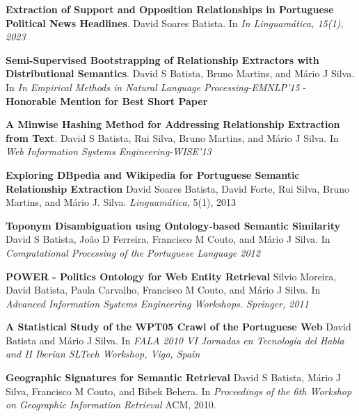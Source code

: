 
\vspace{-5.5mm}

\begin{cventries}

  \cventry
    {} %
    {} %
    {} %
    {} %
    {
      \begin{cvitems} %
        \item {{\bf Extraction of Support and Opposition Relationships in Portuguese Political News Headlines}. David Soares Batista. In {\it In Linguamática, 15(1), 2023}}
  		\vspace{1.0mm}
        \item {{\bf Semi-Supervised Bootstrapping of Relationship Extractors with Distributional Semantics}. David S Batista, Bruno Martins, and Mário J Silva. In {\it In Empirical Methods in Natural Language Processing-EMNLP'15} - {\bf Honorable Mention for Best Short Paper}}
		\vspace{2.0mm}
		\item {{\bf A Minwise Hashing Method for Addressing Relationship Extraction from Text}. David S Batista, Rui Silva, Bruno Martins, and Mário J Silva. In {\it Web Information Systems Engineering-WISE'13}}
		\vspace{2.0mm}
		\item {{\bf Exploring DBpedia and Wikipedia for Portuguese Semantic Relationship Extraction} David Soares Batista, David Forte, Rui Silva, Bruno Martins, and Mário J. Silva. {\it Linguamática,} 5(1), 2013}
		\vspace{2.0mm}
		\item {{\bf Toponym Disambiguation using Ontology-based Semantic Similarity} David S Batista, João D Ferreira, Francisco M Couto, and Mário J Silva. In {\it Computational Processing of the Portuguese Language 2012}}
		\vspace{2.0mm}
		\item {{\bf POWER - Politics Ontology for Web Entity Retrieval} Silvio Moreira, David Batista, Paula Carvalho, Francisco M Couto, and Mário J Silva. In {\it Advanced Information Systems Engineering Workshops. Springer, 2011}}
		\vspace{2.0mm}
		\item {{\bf A Statistical Study of the WPT05 Crawl of the Portuguese Web} David Batista and Mário J Silva. In {\it FALA 2010 VI Jornadas en Tecnología del Habla and II Iberian SLTech Workshop, Vigo, Spain}}
		\vspace{2.0mm}
		\item {{\bf Geographic Signatures for Semantic Retrieval} David S Batista, Mário J Silva, Francisco M Couto, and Bibek Behera. In {\it Proceedings of the 6th Workshop on Geographic Information Retrieval} ACM, 2010.}		
      \end{cvitems}
    }
\end{cventries}



